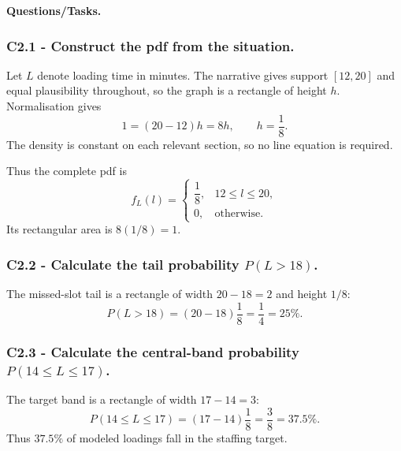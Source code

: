 \begingroup{}
\endgroup

\textbf{Questions/Tasks.}
\begin{enumerate}
\end{enumerate}

\subsubsection*{C2.1 - Construct the pdf from the situation.}
\label{subsec:c2-uniform-cold-chain-a}
Let $L$ denote loading time in minutes.  The narrative gives support $[12,20]$
and equal plausibility throughout, so the graph is a rectangle of height $h$.
Normalisation gives
\[
 1=(20-12)h=8h,\qquad h=\frac18.
\]
The density is constant on each relevant section, so no line equation is required.

Thus the complete pdf is
\[
 f_L(l)=\begin{cases}\dfrac18,&12\le l\le20,\\[2mm]0,&\text{otherwise.}\end{cases}
\]
Its rectangular area is $8(1/8)=1$.

\subsubsection*{C2.2 - Calculate the tail probability $P(L>18)$.}
\label{subsec:c2-uniform-cold-chain-b}
The missed-slot tail is a rectangle of width $20-18=2$ and height $1/8$:
\[
 P(L>18)=(20-18)\frac18=\frac14=25\%.
\]

\subsubsection*{C2.3 - Calculate the central-band probability
$P(14\le L\le17)$.}
\label{subsec:c2-uniform-cold-chain-c}
The target band is a rectangle of width $17-14=3$:
\[
 P(14\le L\le17)=(17-14)\frac18=\frac38=37.5\%.
\]
Thus $37.5\%$ of modeled loadings fall in the staffing target.

